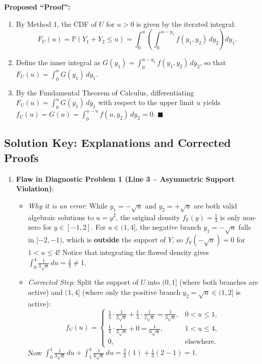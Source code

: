 \documentclass[11pt, letterpaper]{article}
\theoremstyle{definition}
\theoremstyle{remark}
\newcommand{\Prob}{\mathbb{P}}
\begin{document}
\begin{itemize}
\textbf{Proposed ``Proof'':}
\begin{enumerate}[label=\textbf{Line \arabic*:}]
    \item By Method 1, the CDF of $U$ for $u > 0$ is given by the iterated integral:
    \[
        F_U(u) = \Prob(Y_1 + Y_2 \le u) = \int_0^u \left( \int_0^{u - y_1} f(y_1, y_2) \, dy_2 \right) dy_1.
    \]
    \item Define the inner integral as $G(y_1) = \int_0^{u - y_1} f(y_1, y_2) \, dy_2$, so that $F_U(u) = \int_0^u G(y_1) \, dy_1$.
    \item By the Fundamental Theorem of Calculus, differentiating $F_U(u) = \int_0^u G(y_1) \, dy_1$ with respect to the upper limit $u$ yields $f_U(u) = G(u) = \int_0^{u - u} f(u, y_2) \, dy_2 = 0$. $\blacksquare$
\end{enumerate}

\subsection{Solution Key: Explanations and Corrected Proofs}

\begin{enumerate}[label=\textbf{Resolution \arabic*:}]
    \item \textbf{Flaw in Diagnostic Problem 1 (Line 3 -- Asymmetric Support Violation)}:
    \begin{itemize}
        \item \textit{Why it is an error}: While $y_1 = -\sqrt{u}$ and $y_2 = +\sqrt{u}$ are both valid algebraic solutions to $u = y^2$, the original density $f_Y(y) = \frac{1}{3}$ is only non-zero for $y \in [-1, 2]$. For $u \in (1, 4]$, the negative branch $y_1 = -\sqrt{u}$ falls in $[-2, -1)$, which is \textbf{outside} the support of $Y$, so $f_Y(-\sqrt{u}) = 0$ for $1 < u \le 4$! Notice that integrating the flawed density gives $\int_0^4 \frac{1}{3\sqrt{u}}\,du = \frac{4}{3} \neq 1$.
        \item \textit{Corrected Step}: Split the support of $U$ into $(0, 1]$ (where both branches are active) and $(1, 4]$ (where only the positive branch $y_2 = \sqrt{u} \in (1, 2]$ is active):
        \[
            f_U(u) = \begin{cases}
                \displaystyle \frac{1}{3}\cdot\frac{1}{2\sqrt{u}} + \frac{1}{3}\cdot\frac{1}{2\sqrt{u}} = \frac{1}{3\sqrt{u}}, & 0 < u \le 1, \\[8pt]
                \displaystyle \frac{1}{3}\cdot\frac{1}{2\sqrt{u}} + 0 = \frac{1}{6\sqrt{u}}, & 1 < u \le 4, \\[6pt]
                0, & \text{elsewhere.}
            \end{cases}
        \]
        Now $\int_0^1 \frac{1}{3\sqrt{u}}\,du + \int_1^4 \frac{1}{6\sqrt{u}}\,du = \frac{2}{3}(1) + \frac{1}{3}(2 - 1) = 1$.
    \end{itemize}


\end{enumerate}
\end{itemize}
\end{document}
